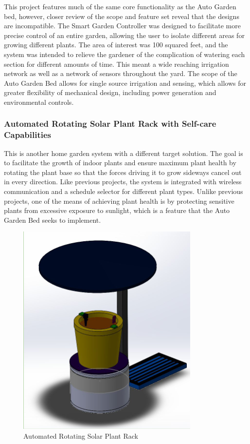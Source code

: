 This project features much of the same core functionality as the Auto Garden bed, however, closer review of the scope and feature set reveal that the designs are incompatible. The Smart Garden Controller was designed to facilitate more precise control of an entire garden, allowing the user to isolate different areas for growing different plants. The area of interest was 100 squared feet, and the system was intended to relieve the gardener of the complication of watering each section for different amounts of time. This meant a wide reaching irrigation network as well as a network of sensors throughout the yard. The scope of the Auto Garden Bed allows for single source irrigation and sensing, which allows for greater flexibility of mechanical design, including power generation and environmental controls.

\subsubsection{Automated Rotating Solar Plant Rack with Self-care Capabilities}

This is another home garden system with a different target solution. The goal is to facilitate the growth of indoor plants and ensure maximum plant health by rotating the plant base so that the forces driving it to grow sideways cancel out in every direction. Like previous projects, the system is integrated with wireless communication and a schedule selector for different plant types. Unlike previous projects, one of the means of achieving plant health is by protecting sensitive plants from excessive exposure to sunlight, which is a feature that the Auto Garden Bed seeks to implement. 

\begin{figure}[H]
    \caption{Automated Rotating Solar Plant Rack}
    \centering
    \includegraphics[width=.6\textwidth]{images/3-1-4Pic.png}
\end{figure}

